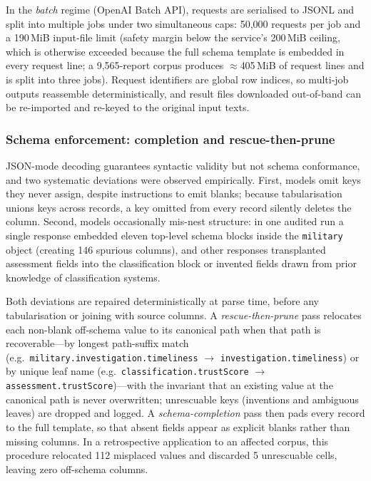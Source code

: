 \documentclass[11pt,a4paper]{article}
\newcommand{\field}[1]{\texttt{#1}}
\begin{document}
In the \emph{batch} regime (OpenAI Batch API), requests are serialised to JSONL and
split into multiple jobs under two simultaneous caps: 50{,}000 requests per job and a
190\,MiB input-file limit (safety margin below the service's 200\,MiB ceiling, which
is otherwise exceeded because the full schema template is embedded in every request
line; a 9{,}565-report corpus produces $\approx$405\,MiB of request lines and is split
into three jobs). Request identifiers are global row indices, so multi-job outputs
reassemble deterministically, and result files downloaded out-of-band can be re-imported
and re-keyed to the original input texts.

\subsubsection{Schema enforcement: completion and rescue-then-prune}
JSON-mode decoding guarantees syntactic validity but not schema conformance, and two
systematic deviations were observed empirically. First, models omit keys they never
assign, despite instructions to emit blanks; because tabularisation unions keys across
records, a key omitted from every record silently deletes the column. Second, models
occasionally mis-nest structure: in one audited run a single response embedded eleven
top-level schema blocks inside the \field{military} object (creating 146 spurious
columns), and other responses transplanted assessment fields into the classification
block or invented fields drawn from prior knowledge of classification systems.

Both deviations are repaired deterministically at parse time, before any tabularisation
or joining with source columns. A \emph{rescue-then-prune} pass relocates each
non-blank off-schema value to its canonical path when that path is recoverable---by
longest path-suffix match (e.g.\ \field{military.investigation.timeliness}
$\rightarrow$ \field{investigation.timeliness}) or by unique leaf name (e.g.\
\field{classification.trustScore} $\rightarrow$ \field{assessment.trustScore})---with
the invariant that an existing value at the canonical path is never overwritten;
unrescuable keys (inventions and ambiguous leaves) are dropped and logged.
A \emph{schema-completion} pass then pads every record to the full template, so that
absent fields appear as explicit blanks rather than missing columns. In a retrospective
application to an affected corpus, this procedure relocated 112 misplaced values and
discarded 5 unrescuable cells, leaving zero off-schema columns.
\end{document}
